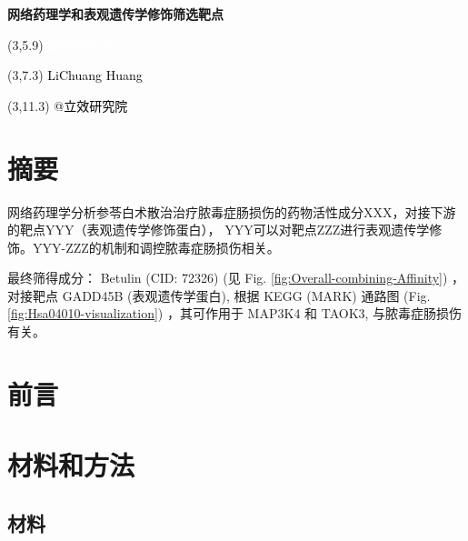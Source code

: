 \documentclass[
]{article}
\author{}
\date{\vspace{-2.5em}}
\begin{document}
\begin{titlepage} 
\begin{center} \textbf{\Huge
网络药理学和表观遗传学修饰筛选靶点} \vspace{4em}
\begin{textblock}{10}(3,5.9) \huge
\textbf{\textcolor{white}{2024-03-25}}
\end{textblock} \begin{textblock}{10}(3,7.3)
\Large \textcolor{black}{LiChuang Huang}
\end{textblock} \begin{textblock}{10}(3,11.3)
\Large \textcolor{black}{@立效研究院}
\end{textblock} \end{center} \end{titlepage}
\restoregeometry


\tableofcontents

\listoffigures

\listoftables

\newpage


\hypertarget{abstract}{%
\section{摘要}\label{abstract}}

网络药理学分析参苓白术散治治疗脓毒症肠损伤的药物活性成分XXX，对接下游的靶点YYY（表观遗传学修饰蛋白）， YYY可以对靶点ZZZ进行表观遗传学修饰。YYY-ZZZ的机制和调控脓毒症肠损伤相关。

最终筛得成分： Betulin (CID: 72326) (见 Fig. \ref{fig:Overall-combining-Affinity}) ，对接靶点 GADD45B (表观遗传学蛋白),
根据 KEGG (MARK) 通路图 (Fig. \ref{fig:Hsa04010-visualization}) ，其可作用于 MAP3K4 和 TAOK3, 与脓毒症肠损伤有关。

\hypertarget{introduction}{%
\section{前言}\label{introduction}}

\hypertarget{methods}{%
\section{材料和方法}\label{methods}}

\hypertarget{ux6750ux6599}{%
\subsection{材料}\label{ux6750ux6599}}
\end{document}
